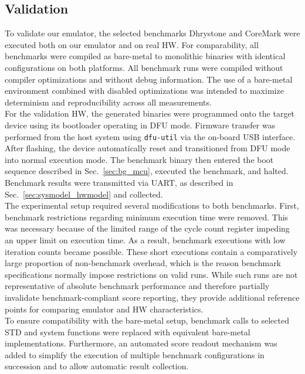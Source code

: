 \documentclass[english]{tudscrartcl}
\begin{document}
		\subsection{Validation}
			\label{sec:meth_valid}
			To validate our emulator, the selected benchmarks Dhrystone and CoreMark were executed both on our emulator and on real \ac{HW}.
			For comparability, all benchmarks were compiled as bare-metal to monolithic binaries with identical configurations on both platforms.
			All benchmark runs were compiled without compiler optimizations and without debug information.
			The use of a bare-metal environment combined with disabled optimizations was intended to maximize determinism and reproducibility across all measurements.
			\\
			For the validation \ac{HW}, the generated binaries were programmed onto the target device using its bootloader operating in DFU mode.
			Firmware transfer was performed from the host system using \texttt{dfu-util} via the on-board USB interface.
			After flashing, the device automatically reset and transitioned from DFU mode into normal execution mode.
			The benchmark binary then entered the boot sequence described in Sec.~\ref{sec:bg_mcu}, executed the benchmark, and halted.
			Benchmark results were transmitted via \ac{UART}, as described in Sec.~\ref{sec:sysmodel_hwmodel} and collected.
			\\
			The experimental setup required several modifications to both benchmarks.
			First, benchmark restrictions regarding minimum execution time were removed.
			This was necessary because of the limited range of the cycle count register impeding an upper limit on execution time.
			As a result, benchmark executions with low iteration counts became possible.
			These short executions contain a comparatively large proportion of non-benchmark overhead, which is the reason benchmark specifications normally impose restrictions on valid runs.
			While such runs are not representative of absolute benchmark performance and therefore partially invalidate benchmark-compliant score reporting, they provide additional reference points for comparing emulator and \ac{HW} characteristics.
			\\
			To ensure compatibility with the bare-metal setup, benchmark calls to selected \ac{STD} and system functions were replaced with equivalent bare-metal implementations.
			Furthermore, an automated score readout mechanism was added to simplify the execution of multiple benchmark configurations in succession and to allow automatic result collection.
\end{document}
